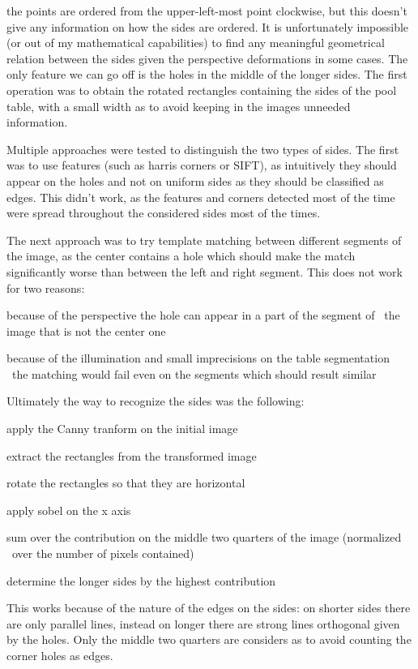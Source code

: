 the points are ordered from the upper-left-most point clockwise, but this doesn't give
any information on how the sides are ordered. It is unfortunately impossible (or out of my
mathematical capabilities) to find any meaningful geometrical relation between the sides
given the perspective deformations in some cases. The only feature we can go off is the 
holes in the middle of the longer sides. The first operation was to obtain the rotated
rectangles containing the sides of the pool table, with a small width as to avoid 
keeping in the images unneeded information.\par 
Multiple approaches were tested to distinguish the two types of sides. The first was 
to use features (such as harris corners or SIFT), as intuitively they should appear 
on the holes and not on uniform sides as they should be classified as edges. This didn't
work, as the features and corners detected most of the time were spread throughout the 
considered sides most of the times.\par
The next approach was to try template matching between different segments of the image,
as the center contains a hole which should make the match significantly worse than
between the left and right segment. This does not work for two reasons:
\begin{list}
    \item because of the perspective the hole can appear in a part of the segment of  \
        the image that is not the center one
    \item because of the illumination and small imprecisions on the table segmentation \
        the matching would fail even on the segments which should result similar
\end{list}
\par
Ultimately the way to recognize the sides was the following:
\begin{list}
    \item apply the Canny tranform on the initial image
    \item extract the rectangles from the transformed image
    \item rotate the rectangles so that they are horizontal
    \item apply sobel on the x axis
    \item sum over the contribution on the middle two quarters of the image (normalized \ 
        over the number of pixels contained)
    \item determine the longer sides by the highest contribution
\end{list}
This works because of the nature of the edges on the sides: on shorter sides there
are only parallel lines, instead on longer there are strong lines orthogonal given by the holes.
Only the middle two quarters are considers as to avoid counting the corner holes as edges.
